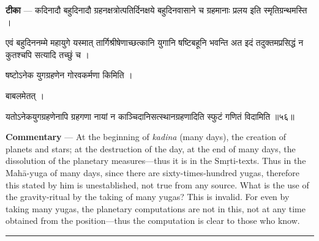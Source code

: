 \documentclass[11pt,a4paper]{article}
\newcommand{\skt}[1]{{\devanagarifont\color{sktcolor} #1}}
\newenvironment{bilingual}{%
  \par\noindent
  \begin{minipage}[t]{0.47\textwidth}%
}{%
  \par\end{minipage}%
}
\newcommand{\rightcol}{%
  \par\end{minipage}%
  \hfill
  \begin{minipage}[t]{0.47\textwidth}%
}
\begin{document}
\medskip

\begin{bilingual}
\textbf{टीका} --- \skt{कदिनादौ बहुदिनादौ ग्रहनक्षत्रोत्पतिर्दिनक्षये बहुदिनवासाने च ग्रहमानाः प्रलय इति स्मृतिग्रन्थमस्ति} ।

\skt{एवं बहुदिननम्मे महायुगे यस्मात् तार्गिश्रीषेणाच्छत्कानि युगानि षष्टिबहूनि भवन्ति अत इदं तदुक्तमप्रसिद्धं न कुतश्चपि सत्यादि तच्छुं च} ।

\skt{षष्टोऽनेक युगग्रहणेन गोरवकर्मणा किमिति} ।

\skt{बाबलमेतत्} ।

\skt{यतोऽनेकयुगग्रहणेनापि ग्रहगणा नायां न काञ्चिदानिसत्स्थानग्रहणादिति स्फुटं गणितं विदामिति} ॥५६॥
\rightcol
\textbf{Commentary} --- At the beginning of \textit{kadina} (many days), the creation of planets and stars; at the destruction of the day, at the end of many days, the dissolution of the planetary measures---thus it is in the Smṛti-texts. Thus in the Mahā-yuga of many days, since there are sixty-times-hundred yugas, therefore this stated by him is unestablished, not true from any source. What is the use of the gravity-ritual by the taking of many yugas? This is invalid. For even by taking many yugas, the planetary computations are not in this, not at any time obtained from the position---thus the computation is clear to those who know.
\end{bilingual}

\medskip
\noindent\rule{\textwidth}{0.4pt}
\end{document}
